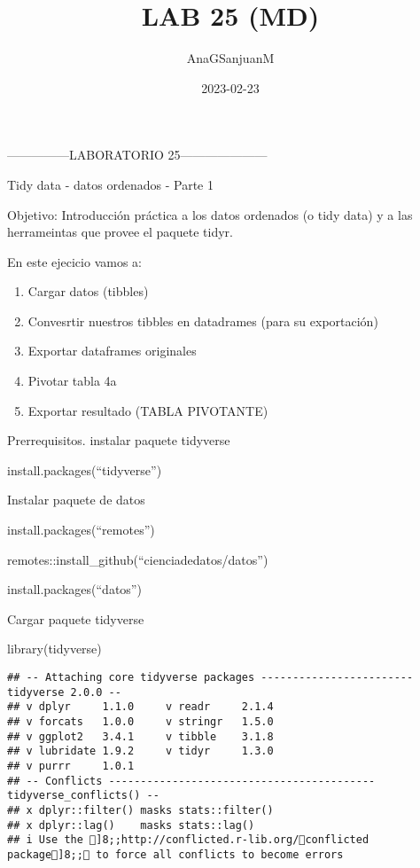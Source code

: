 \documentclass[
]{article}
\title{LAB 25 (MD)}
\author{AnaGSanjuanM}
\date{2023-02-23}
\newenvironment{Shaded}{\begin{snugshade}}{\end{snugshade}}
\newcommand{\FunctionTok}[1]{\textcolor[rgb]{0.00,0.00,0.00}{#1}}
\newcommand{\NormalTok}[1]{#1}
\begin{document}
\maketitle

---------------LABORATORIO 25---------------------

Tidy data - datos ordenados - Parte 1

Objetivo: Introducción práctica a los datos ordenados (o tidy data) y a
las herrameintas que provee el paquete tidyr.

En este ejecicio vamos a:

\begin{enumerate}
\def\labelenumi{\arabic{enumi}.}
\item
  Cargar datos (tibbles)
\item
  Convesrtir nuestros tibbles en datadrames (para su exportación)
\item
  Exportar dataframes originales
\item
  Pivotar tabla 4a
\item
  Exportar resultado (TABLA PIVOTANTE)
\end{enumerate}

Prerrequisitos. instalar paquete tidyverse

install.packages(``tidyverse'')

Instalar paquete de datos

install.packages(``remotes'')

remotes::install\_github(``cienciadedatos/datos'')

install.packages(``datos'')

Cargar paquete tidyverse

\begin{Shaded}
\begin{Highlighting}[]
\FunctionTok{library}\NormalTok{(tidyverse)}
\end{Highlighting}
\end{Shaded}

\begin{verbatim}
## -- Attaching core tidyverse packages ------------------------ tidyverse 2.0.0 --
## v dplyr     1.1.0     v readr     2.1.4
## v forcats   1.0.0     v stringr   1.5.0
## v ggplot2   3.4.1     v tibble    3.1.8
## v lubridate 1.9.2     v tidyr     1.3.0
## v purrr     1.0.1     
## -- Conflicts ------------------------------------------ tidyverse_conflicts() --
## x dplyr::filter() masks stats::filter()
## x dplyr::lag()    masks stats::lag()
## i Use the ]8;;http://conflicted.r-lib.org/conflicted package]8;; to force all conflicts to become errors
\end{verbatim}
\end{document}
